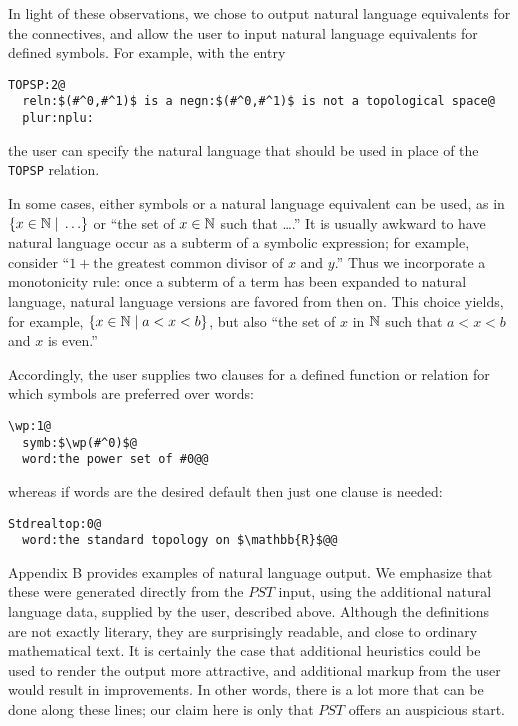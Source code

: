\documentclass{llncs}
\newcommand{\na}[1]{\mathit{#1}}    \newcommand{\fn}[1]{\mathit{#1}}    \newcommand{\ax}[1]{\mathit{(#1)}}  \newcommand{\mdl}[1]{\mathcal{#1}}
\newcommand{\st}{ \; | \; } \newcommand{\ph}{\varphi}
\begin{document}
In light of these observations, we chose to output natural language
equivalents for the connectives, and allow the user to input natural
language equivalents for defined symbols. For example, with the entry
\begin{center}
\begin{verbatim}
TOPSP:2@
  reln:$(#^0,#^1)$ is a negn:$(#^0,#^1)$ is not a topological space@
  plur:nplu:\end{verbatim}
\end{center}
the user can specify the natural language that should be used in place of the {\tt TOPSP} relation.

In some cases, either symbols or a natural language equivalent can be
used, as in $\{ x \in \Bbb N \st \ldots \}$ or ``the set of $x \in
\Bbb N$ such that \ldots.'' It is usually awkward to have natural
language occur as a subterm of a symbolic expression; for example,
consider ``$1 + \mbox{the greatest common divisor of $x$ and $y$}$.''
Thus we incorporate a monotonicity rule: once a subterm of a term has
been expanded to natural language, natural language versions are
favored from then on. This choice yields, for example, $\{ x \in
\Bbb N \st a < x < b \}$, but also ``the set of $x$ in $\Bbb N$
such that $a < x < b$ and $x$ is even.''

Accordingly, the user supplies two clauses for a defined function or relation for which symbols are preferred over words:
\begin{verbatim}
\wp:1@
  symb:$\wp(#^0)$@
  word:the power set of #0@@
\end{verbatim}
whereas if words are the desired default then just one clause is needed:
\begin{verbatim}
Stdrealtop:0@
  word:the standard topology on $\mathbb{R}$@@
\end{verbatim}

Appendix B provides examples of natural language output. We emphasize
that these were generated directly from the $\na{PST}$ input, using
the additional natural language data, supplied by the user, described
above. Although the definitions are not exactly literary, they are
surprisingly readable, and close to ordinary mathematical text. It is
certainly the case that additional heuristics could be used to render
the output more attractive, and additional markup from the user would
result in improvements. In other words, there is a lot more that can
be done along these lines; our claim here is only that $\na{PST}$
offers an auspicious start.
\end{document}
